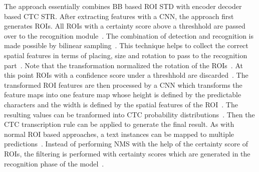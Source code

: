 The approach essentially combines \ac{BB} based \ac{ROI} \ac{STD} with encoder decoder based \ac{CTC}
\ac{STR}.
After extracting features with a \ac{CNN}, the approach first generates \acp{ROI}.
All \acp{ROI} with a certainty score above a threshhold are passed over to the recognition
module~\citep{busta_deep_2017}.
The combination of detection and recognition is made possible by bilinear
sampling~\cite{busta_deep_2017}.
This technique helps to collect the correct spatial features in terms of placing, size and rotation
to pass to the recognition part~\citep{busta_deep_2017}.
Note that the transformation normalized the rotation of the \acp{ROI}~\citep{busta_deep_2017}.
At this point \acp{ROI} with a confidence score under a threshhold are
discarded~\citep{busta_deep_2017}.
The transformed \ac{ROI} features are then processed by a \ac{CNN} which transforms the feature maps
into one feature map whose height is defined by the predictable characters and the width is defined
by the spatial features of the \ac{ROI}~\citep{busta_deep_2017}.
The resulting values can be tranformed into \ac{CTC} probability
distributions~\citep{busta_deep_2017,graves_connectionist_2006}.
Then the \ac{CTC} transcription rule can be applied to generate the final result.
As with normal \ac{ROI} based approaches, a text instances can be mapped to multiple
predictions~\citep{ren_faster_2016,busta_deep_2017}.
Instead of performing \ac{NMS} with the help of the certainty score of \acp{ROI}, the filtering
is performed with certainty scores which are generated in the recognition phase of the
model~\citep{busta_deep_2017}.


